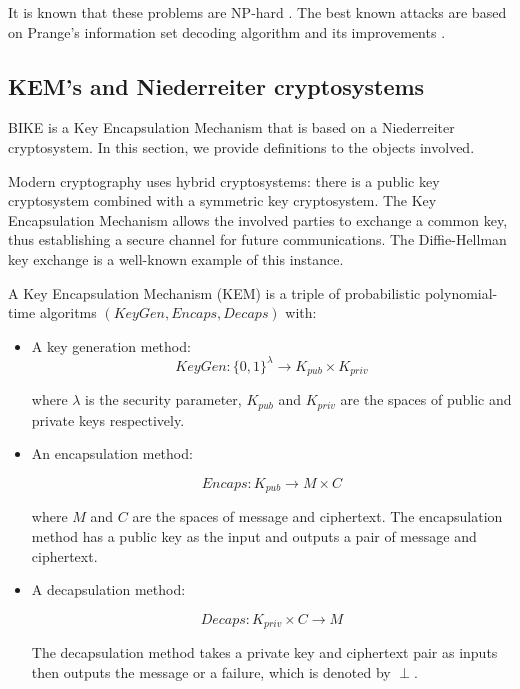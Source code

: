 It is known that these problems are NP-hard \cite{nphard}. The best known attacks are based on Prange's information set decoding algorithm and its improvements \cite{prange,Stern:1988:ISD,MMT:2011:ISD,BJMM:2012:ISD}.

\subsection{KEM's and Niederreiter cryptosystems}

BIKE is a Key Encapsulation Mechanism that is based on a Niederreiter cryptosystem. In this section, we provide definitions to the objects involved.

Modern cryptography uses hybrid cryptosystems: there is a public key cryptosystem combined with a symmetric key cryptosystem. The Key Encapsulation Mechanism allows the involved parties to exchange a common key, thus establishing a secure channel for future communications. The Diffie-Hellman key exchange is a well-known example of this instance.

\begin{defn}
A Key Encapsulation Mechanism (KEM) is a triple of probabilistic polynomial-time algoritms $(KeyGen, Encaps, Decaps)$ with:

\begin{itemize}
\item A key generation method:
\[
KeyGen: \{ 0,1 \}^\lambda \rightarrow K_{pub} \times K_{priv}
\]

where $\lambda$ is the security parameter, $K_{pub}$ and $K_{priv}$ are the spaces of public and private keys respectively.

\item An encapsulation method:

\[
Encaps: K_{pub} \rightarrow M \times C
\]

where $M$ and $C$ are the spaces of message and ciphertext. The encapsulation method has a public key as the input and outputs a pair of message and ciphertext.

\item A decapsulation method:

\[
Decaps: K_{priv} \times C \rightarrow M
\]

The decapsulation method takes a private key and ciphertext pair as inputs then outputs the message or a failure, which is denoted by $\perp$.
\end{itemize}
\end{defn}

